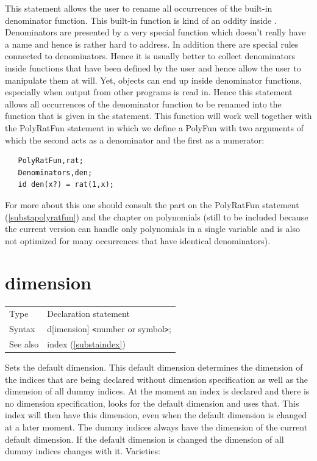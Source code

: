 \noindent This statement allows the user to rename all 
occurrences of the built-in denominator function. This built-in function is 
kind of an oddity inside \FORM\@. Denominators are presented by a very special 
function which doesn't really have a name and hence is rather hard to 
address. In addition there are special rules connected to denominators. 
Hence it is usually better to collect denominators inside functions that 
have been defined by the user and hence allow the user to manipulate them 
at will. Yet, objects can end up inside denominator functions, especially 
when output from other programs is read in. Hence this statement allows all 
occurrences of the denominator function to be renamed into the function 
that is given in the statement. This function will work well together with 
the PolyRatFun statement in which we define a PolyFun with two arguments of 
which the second acts as a denominator and the first as a numerator:
\begin{verbatim}
   PolyRatFun,rat;
   Denominators,den;
   id den(x?) = rat(1,x);
\end{verbatim}
For more about this one should consult the part on the 
PolyRatFun statement 
(\ref{substapolyratfun}) and the chapter on polynomials (still to be 
included because the current version can handle only polynomials in a 
single variable and is also not optimized for many occurrences that have 
identical denominators).
\vspace{10mm}

 
\section{dimension}
\label{substadimension}

\noindent \begin{tabular}{ll}
Type & Declaration statement\\
Syntax & d[imension] {\tt<}number or symbol{\tt>};
\\ See also & index (\ref{substaindex})
\end{tabular} \vspace{4mm}

\noindent Sets the default dimension. This default 
dimension determines the dimension of the indices that are 
being declared without dimension specification as well as the dimension of 
all dummy indices. At the moment an index is declared 
and there is no dimension specification, {\FORM} looks for the default 
dimension and uses that. This index will then have this dimension, even 
when the default dimension is changed at a later moment. The dummy indices 
always have the dimension of the current default dimension. If the default 
dimension is changed the dimension of all dummy indices changes with it. 
Varieties: \vspace{1mm}

